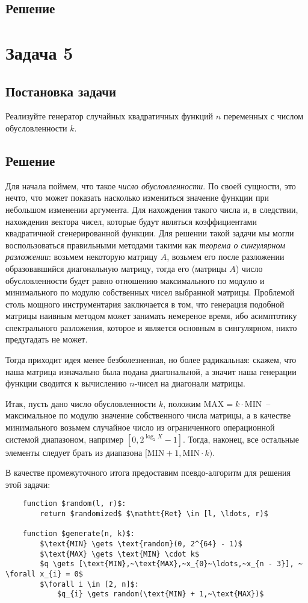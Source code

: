 \documentclass[12pt, a4paper, oneside]{article}
\begin{document}
	\subsection*{Решение}
	\section*{Задача 5}
	\subsection*{Постановка задачи}
	Реализуйте генератор случайных квадратичных функций $n$ переменных с числом обусловленности $k$.
	\subsection*{Решение}
	Для начала поймем, что такое \textit{число обусловленности}. По своей сущности, это нечто, что может показать насколько измениться значение функции при небольшом изменении аргумента. Для нахождения такого числа и, в следствии, нахождения вектора чисел, которые будут являться коэффициентами квадратичной сгенерированной функции. Для решении такой задачи мы могли воспользоваться правильными методами такими как \textit{теорема о сингулярном разложении}: возьмем некоторую матрицу $A$, возьмем его после разложении образовавшийся диагональную матрицу, тогда его (матрицы $A$) число обусловленности будет равно отношению максимального по модулю и минимального по модулю собственных чисел выбранной матрицы. Проблемой столь мощного инструментария заключается в том, что генерация подобной матрицы наивным методом может занимать немереное время, ибо асимптотику спектрального разложения, которое и является основным в сингулярном, никто предугадать не может.

	Тогда приходит идея менее безболезненная, но более радикальная: скажем, что наша матрица изначально была подана диагональной, а значит наша генерации функции сводится к вычислению $n$-чисел на диагонали матрицы.

	Итак, пусть дано число обусловленности $k$, положим $\text{MAX} = k \cdot \text{MIN}$~-- максимальное по модулю значение собственного числа матрицы, а в качестве минимального возьмем случайное число из ограниченного операционной системой диапазоном, например $[0, 2^{\log_{2}{X}} - 1]$. Тогда, наконец, все остальные элементы следует брать из диапазона $[\text{MIN} + 1, \text{MIN} \cdot k)$.

	В качестве промежуточного итога предоставим псевдо-алгоритм для решения этой задачи:
	\begin{lstlisting}
	function $random(l, r)$:
		return $randomized$ $\mathtt{Ret} \in [l, \ldots, r)$
			
	function $generate(n, k)$:
		$\text{MIN} \gets \text{random}(0, 2^{64} - 1)$
		$\text{MAX} \gets \text{MIN} \cdot k$
		$q \gets [\text{MIN},~\text{MAX},~x_{0}~\ldots,~x_{n - 3}], ~ \forall x_{i} = 0$
		$\forall i \in [2, n]$:
			$q_{i} \gets random(\text{MIN} + 1,~\text{MAX})$
	\end{lstlisting}
\end{document}
